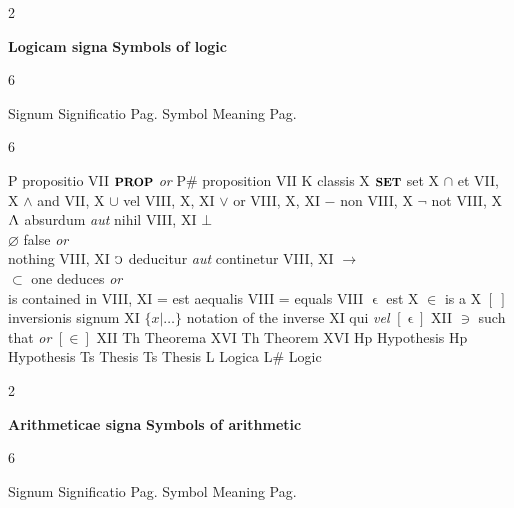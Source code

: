 \documentclass{book}
\newcommand{\s}{\switchcolumn} %
\newcommand{\C}{\mathop{\sbox0{$\displaystyle$$\reflectbox{C}$} %
\raisebox{-\height+\ht0-0.05cm}[\ht0][\dp0]{\scalebox{0.8}[0.8]{\copy0}}}\displaylimits} %
\newcommand{\abs}{\mathop{\rotatebox[origin=c]{180}{V}}}
\newcommand{\such}{\thinspace \rotatebox[origin=c]{180}{$\epsilon$}}
\newcommand{\smallIn}{\ensuremath{\mathrel{\epsilon}}}
\newcommand{\setOfSets}{\mathord{\text{{\footnotesize \textbf{SET}}}}}
\newcommand{\prop}{\mathord{\text{{\footnotesize \textbf{PROP}}}}}
\newenvironment{translateTwoCol}
               { %
                 \columnratio{0.5, 0.5} \begin{paracol}{2}
                 \newcommand{\LAT}{\switchcolumn[0]*}
                 \newcommand{\ENG}{\switchcolumn[1]}
               }
               { %
                 \let\ENG\undefined
                 \let\LAT\undefined
                 \end{paracol}
               }
\newenvironment{translateSixCol}[6]
               { %
                 \setcolumnwidth{#1\fill/1em, #2\fill/1em, #3\fill/\columnsep, #4\fill/1em, #5\fill/1em, #6\fill}
                 \begin{paracol}{6}
               }
               { %
                 \end{paracol}
               }
\begin{document}
\begin{translateTwoCol}
\centering
\textbf{Logicam signa}
\ENG
\textbf{Symbols of logic}
\end{translateTwoCol}

\begin{translateSixCol}{0.05}{0.35}{0.1}{0.05}{0.35}{0.1}
\raggedright
Signum \s Significatio \s Pag.
\s Symbol \s Meaning \s Pag.
\end{translateSixCol}

\begin{translateSixCol}{0.06}{0.34}{0.1}{0.06}{0.34}{0.1}
\raggedright
P \s propositio \s VII
\s $\prop$ \emph{or} P\# \s proposition \s VII
\s* $\text{K}$ \s classis \s X
\s $\setOfSets$ \s set \s X
\s* $\cap$ \s et \s VII, X
\s $\wedge$ \s and \s VII, X
\s* $\cup$ \s vel \s VIII, X, XI
\s $\vee$ \s or \s VIII, X, XI
\s* $-$ \s non \s VIII, X
\s $\neg$ \s not \s VIII, X
\s* $\abs$ \s absurdum \emph{aut} nihil \s VIII, XI
\s $\bot$ \\ $\varnothing$ \s false \emph{or} \\ \quad nothing \s VIII, XI
\s* $\C$ \s deducitur \emph{aut} continetur \s VIII, XI
\s $\rightarrow$ \\ $\subset$ \s one deduces \emph{or} \\ \quad is contained in \s VIII, XI
\s* = \s est aequalis \s VIII
\s = \s equals \s VIII
\s* $\smallIn$ \s est \s X
\s $\in$ \s is a \s X   %
\s* $[ \ ]$ \s inversionis signum \s XI
\s $\{ x | \ldots \}$ \s notation of the inverse \s XI  %
\s* \such \s qui \emph{vel} $[ \smallIn ]$ \s XII
\s $\ni$ \s such that \emph{or} $[ \in ]$ \s XII
\s* Th \s Theorema \s XVI
\s  Th \s Theorem \s XVI
\s* Hp \s Hypothesis \s
\s  Hp \s Hypothesis \s
\s* Ts \s Thesis \s
\s  Ts \s Thesis \s
\s* L \s Logica \s
\s  L\# \s Logic \s
\end{translateSixCol}

\vspace{1em}
\begin{translateTwoCol}
\centering
\textbf{Arithmeticae signa}
\ENG
\textbf{Symbols of arithmetic}
\end{translateTwoCol}

\begin{translateSixCol}{0.05}{0.35}{0.1}{0.05}{0.35}{0.1}
\raggedright
Signum \s Significatio \s Pag.
\s Symbol \s Meaning \s Pag.
\end{translateSixCol}
\end{document}
